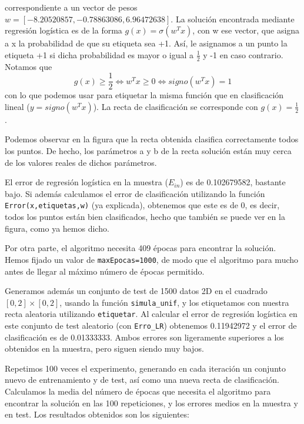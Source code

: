 \documentclass[a4]{article}
\begin{document}
correspondiente a un vector de pesos $w= [-8.20520857, -0.78863086,  6.96472638]$. La solución encontrada mediante regresión logística es de la forma $g(x)=\sigma(w^Tx)$, con w ese vector, que asigna a x la probabilidad de que su etiqueta sea +1. Así, le asignamos a un punto la etiqueta +1 si dicha probabilidad es mayor o igual a $\frac{1}{2}$ y -1 en caso contrario.  Notamos que $$g(x)\geq \frac{1}{2}\Leftrightarrow w^Tx \geq 0 \Longleftrightarrow signo(w^Tx)=1$$ con lo que podemos usar para etiquetar la misma función que en clasificación lineal ($ y=signo(w^Tx) $). La recta de clasificación se corresponde con $g(x)=\frac{1}{2}$.

Podemos observar en la figura que la recta obtenida clasifica correctamente todos los puntos. De hecho, los parámetros a y b de la recta solución están muy cerca de los valores reales de dichos parámetros. 

El error de regresión logística en la muestra ($E_{in}$) es de 0.102679582, bastante bajo. Si además calculamos el error de clasificación utilizando la función \lstinline|Error(x,etiquetas,w)| (ya explicada), obtenemos que este es de 0, es decir, todos los puntos están bien clasificados, hecho que también se puede ver en la figura, como ya hemos dicho. 

Por otra parte, el algoritmo necesita 409 épocas para encontrar la solución. Hemos fijado un valor de \lstinline|maxEpocas=1000|, de modo que el algoritmo para mucho antes de llegar al máximo número de épocas permitido.

Generamos además un conjunto de test de 1500 datos 2D en el cuadrado $ [0, 2] \times [0, 2] $, usando la función \lstinline|simula_unif|, y los etiquetamos con nuestra recta aleatoria utilizando \lstinline|etiquetar|. Al calcular el error de regresión logística en este conjunto de test aleatorio (con \lstinline|Erro_LR|) obtenemos 0.11942972 y el error de clasificación es de 0.01333333. Ambos errores son ligeramente superiores a los obtenidos en la muestra, pero siguen siendo muy bajos.

Repetimos 100 veces el experimento, generando en cada iteración un conjunto nuevo de entrenamiento y de test, así como una nueva recta de clasificación. Calculamos la media del número de épocas que necesita el algoritmo para encontrar la solución en las 100 repeticiones, y los errores medios en la muestra y en test. Los resultados obtenidos son los siguientes:
\end{document}
